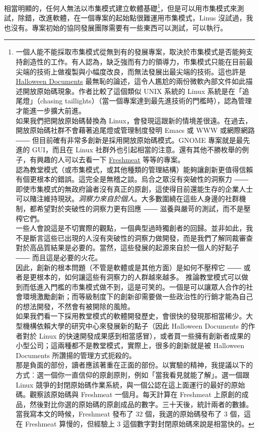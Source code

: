 \documentclass[12pt, a5paper]{book}
\begin{document}
相當明顯的，任何人無法以市集模式建立軟體基礎\footnote{一個人能不能採取市集模式從無到有的發展專案，取決於市集模式是否能夠支持創造性的工作。有人認為，缺乏強而有力的領導力，市集模式只能在目前最尖端的技術上做複製與小幅度改良，而無法發展出最尖端的技術。這也許是
  \href{http://www.opensource.org/halloween/}{Halloween Documents}
  最無恥的論述，這令人尷尬的兩份微軟內部文件如此描述開放原始碼現象。作者比較了這個類似
  UNIX 系統的 Linux 系統是在「追尾燈」（chasing
  taillights）（當一個專案達到最先進技術的門檻時），認為管理才能進一步擴大前進。\\如果我們把開放原始碼替換為
  Linux，會發現這跟新的情境差很遠。在過去，開放原始碼社群不會藉著追尾燈或管理制度發明
  Emacs 或 WWW 或網際網路 ――
  但目前確有非常多創新是採用開放原始碼模式。GNOME 專案就是最先進的
  GUI，而且在 Linux
  社群外也引起相當的注意。還有其他不勝枚舉的例子，有興趣的人可以去看一下
  \href{http://freshmeat.net/}{Freshmeat}
  等等的專案。\\認為教堂模式（或市集模式，或其他種類的管理結構）能夠讓創新更值得信賴有個更根本的錯誤。這完全是無稽之談。烏合之眾沒有突破性的洞察力
  ――
  即使市集模式的無政府論者沒有真正的原創，這使得目前還能生存的企業人士可以賭注維持現狀。\emph{洞察力來自於個人}。大多數圍繞在這些人身邊的社群機制，都希望對於突破性的洞察力更有回應
  ――
  滋養與嚴苛的測試，而不是壓榨它們。\\一些人會說這是不切實際的觀點，一個典型過時獨創者的回歸。並非如此，我不是斷言這些已出現的人沒有突破性的洞察力做開發，而是我們了解同裁審查對於高品質結果是必要的。當然，這些發展的起源來自於一個人的好點子
  ――
  而且這是必要的火花。\\因此，創新的根本問題（不管是軟體或是其他方面）是如何不壓榨它
  ―― 或者是更根本的，如何讓這些有洞察力的人群越來越多。
  推論教堂模式可以做到而低進入門檻的市集模式做不到，這是可笑的。一個是可以讓眾人合作的社會環境激勵創新；而等級制度下的創新卻需要做一些政治性的行銷才能為自己的想法開發，不然會有被開除的風險。\\如果我們看一下採用教堂模式的軟體開發歷史，會很快的發現那相當稀少。大型機構依賴大學的研究中心來發展新的點子（因此
  Halloween Documents 的作者對於 Linux
  的快速開發成果感到相當感冒），或者買一些擁有創新者成果的小型公司；這兩種都不是教堂模式，實際上，很多的創新就是被
  Halloween Documents
  所讚揚的管理方式扼殺的。\\那是負面的部份，讀者應該著重在正面的部份。以實驗的精神，我提議以下的方式︰選一個你一直信仰的原創原則，例如「當我看見就能了解」。選一個跟
  Linux
  競爭的封閉原始碼作業系統，與一個公認在這上面運行的最好的原始碼。觀察該原始碼與
  Freshmeat 一個月。每天計算在 Freshmeat
  上原創的成品，然後對比你選的原始碼的原創成品的數字。三十天後，統計兩者的數據。\\當我寫本文的時候，Freshmeat
  發布了 32 個，我選的原始碼發布了 3 個，這在 Freshmeat 算慢的，但經驗上
  3 這個數字對封閉原始碼來說是相當快的。}，但是可以用市集模式來測試，除錯，改進軟體，在一個專案的起始點很難運用市集模式，Linus
沒試過，我也沒有。專案初始的協同發展團隊需要有一些東西可以測試，可以執行。
\end{document}

